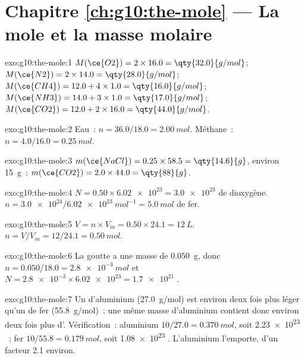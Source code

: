\section*{Chapitre \ref{ch:g10:the-mole} --- La mole et la masse molaire}

\begin{solution}{exo:g10:the-mole:1}
$M(\ce{O2}) = 2 \times 16.0 = \qty{32.0}{g/mol}$;
$M(\ce{N2}) = 2 \times 14.0 = \qty{28.0}{g/mol}$;
$M(\ce{CH4}) = 12.0 + 4 \times 1.0 = \qty{16.0}{g/mol}$;
$M(\ce{NH3}) = 14.0 + 3 \times 1.0 = \qty{17.0}{g/mol}$;
$M(\ce{CO2}) = 12.0 + 2 \times 16.0 = \qty{44.0}{g/mol}$.
\end{solution}

\begin{solution}{exo:g10:the-mole:2}
Eau~: $n = 36.0 / 18.0 = \qty{2.00}{mol}$. Méthane~:
$n = 4.0 / 16.0 = \qty{0.25}{mol}$.
\end{solution}

\begin{solution}{exo:g10:the-mole:3}
$m(\ce{NaCl}) = 0.25 \times 58.5 = \qty{14.6}{g}$, environ \qty{15}{g}~;
$m(\ce{CO2}) = 2.0 \times 44.0 = \qty{88}{g}$.
\end{solution}

\begin{solution}{exo:g10:the-mole:4}
$N = 0.50 \times \num{6.02e23} = \num{3.0e23}$  de dioxygène.
$n = \num{3.0e24} / \qty{6.02e23}{mol^{-1}} = \qty{5.0}{mol}$ de fer.
\end{solution}

\begin{solution}{exo:g10:the-mole:5}
$V = n \times V_m = 0.50 \times 24.1 = \qty{12}{L}$.
$n = V / V_m = 12 / 24.1 = \qty{0.50}{mol}$.
\end{solution}

\begin{solution}{exo:g10:the-mole:6}
La goutte a une masse de \qty{0.050}{g}, donc
$n = 0.050 / 18.0 = \qty{2.8e-3}{mol}$ et
$N = \num{2.8e-3} \times \num{6.02e23} = \num{1.7e21}$ .
\end{solution}

\begin{solution}{exo:g10:the-mole:7}
Un  d'aluminium (\qty{27.0}{g/mol}) est environ deux fois plus
léger qu'un  de fer (\qty{55.8}{g/mol})~: une même masse
d'aluminium contient donc environ deux fois plus d'. Vérification~:
aluminium $10/27.0 = \qty{0.370}{mol}$, soit \num{2.23e23} ~; fer
$10/55.8 = \qty{0.179}{mol}$, soit \num{1.08e23} . L'aluminium
l'emporte, d'un facteur 2.1 environ.
\end{solution}


